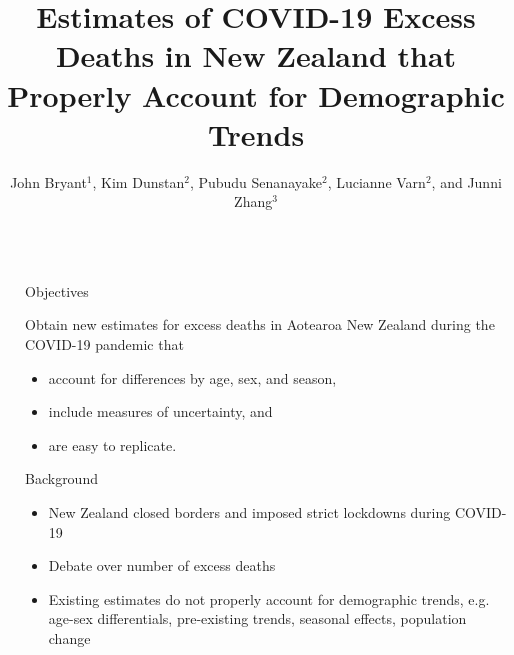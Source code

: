 \documentclass[final]{beamer}
\title{Estimates of COVID-19 Excess Deaths in New Zealand that Properly Account for Demographic Trends}
\author{John Bryant$^1$, Kim Dunstan$^2$, Pubudu Senanayake$^2$, Lucianne Varn$^2$, and Junni Zhang$^3$}
\institute{$^{1}$Bayesian Demography Limited, $^{2}$Statistics New Zealand, $^{3}$Peking University}
\newlength{\sepwid}
\newlength{\onecolwid}
\begin{document}

\setlength{\belowcaptionskip}{2ex} %
\setlength\belowdisplayshortskip{2ex} %

\begin{frame}[t] %

\begin{columns}[t] %

\begin{column}{\sepwid}\end{column} %

\begin{column}{\onecolwid} %



\begin{alertblock}{Objectives}

Obtain new estimates for excess deaths in Aotearoa New Zealand during the COVID-19 pandemic that
\begin{itemize}
\item account for differences by age, sex, and season,
\item include measures of uncertainty, and
\item are easy to replicate.
\end{itemize}

\end{alertblock}


\begin{block}{Background}

  \begin{itemize}
  \item New Zealand closed borders and imposed strict lockdowns during COVID-19
  \item Debate over number of excess deaths
  \item Existing estimates do not properly account for demographic trends, e.g.  age-sex differentials, pre-existing trends, seasonal effects, population change
 \end{itemize}


\end{block}
\end{column}
\end{columns}
\end{frame}
\end{document}
